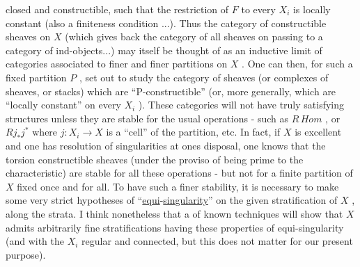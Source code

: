 
closed and constructible, such that the restriction of $F$ to every $X_i$
is locally constant (also a finiteness condition ...). Thus the category
of constructible sheaves on $X$ (which gives back the category of all sheaves
on passing to a category of ind-objects...) may itself be thought of as an
inductive limit of categories associated to finer and finer partitions on $X$ .
One can then, for such a fixed partition $P$ , set out to study the category
of sheaves (or complexes of sheaves, or stacks) which are ``P-constructible''
(or, more generally, which are ``locally constant'' on every $X_i$ ). These
categories will not have truly satisfying structures unless they are stable
for the usual operations - such as $R\,\mathit{Hom}$ , or $Rj_*j^*$ where $j : X_i \to X$ is
a ``cell'' of the partition, etc. In fact, if $X$ is excellent and one has
resolution of singularities at ones disposal, one knows that the torsion
constructible sheaves (under the proviso of being prime to the characteristic)
are stable for all these operations - but not for a finite partition of
$X$ fixed once and for all. To have such a finer stability, it is necessary
to make some very strict hypotheses of ``\uline{equi}-\uline{singularity}'' on the given
stratification of $X$ , along the strata. I think nonetheless that a 
 of known techniques will show that $X$ admits arbitrarily fine
stratifications having these properties of equi-singularity (and with the
$X_i$ regular and connected, but this does not matter for our present purpose).

